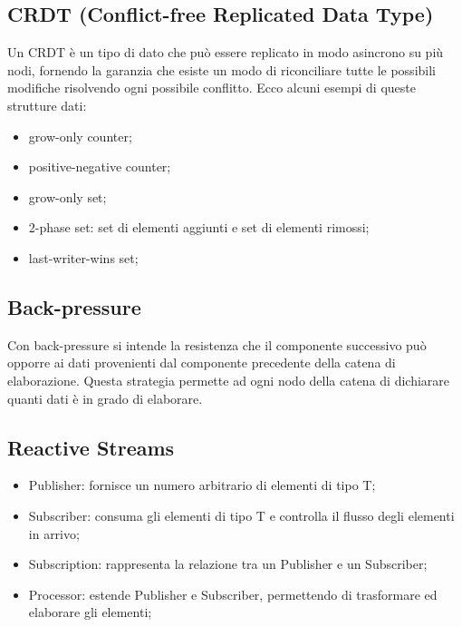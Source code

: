 \documentclass{article}
\begin{document}
\subsection{CRDT (Conflict-free Replicated Data Type)}
Un CRDT è un tipo di dato che può essere replicato in modo asincrono su più
nodi, fornendo la garanzia che esiste un modo di riconciliare tutte le possibili
modifiche risolvendo ogni possibile conflitto. Ecco alcuni esempi di queste
strutture dati:
\begin{itemize}
	\item grow-only counter;

	\item positive-negative counter;

	\item grow-only set;

	\item 2-phase set: set di elementi aggiunti e set di elementi rimossi;

	\item last-writer-wins set;
\end{itemize}

\subsection{Back-pressure}
Con back-pressure si intende la resistenza che il componente successivo può
opporre ai dati provenienti dal componente precedente della catena di
elaborazione. Questa strategia permette ad ogni nodo della catena di dichiarare
quanti dati è in grado di elaborare.

\subsection{Reactive Streams}

\begin{itemize}
	\item Publisher: fornisce un numero arbitrario di elementi di tipo T;

	\item Subscriber: consuma gli elementi di tipo T e controlla il flusso degli
		elementi in arrivo;

	\item Subscription: rappresenta la relazione tra un Publisher e un
		Subscriber;

	\item Processor: estende Publisher e Subscriber, permettendo di trasformare
		ed elaborare gli elementi;
\end{itemize}
\end{document}
